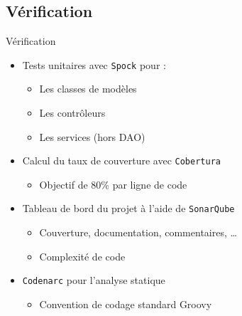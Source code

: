 \subsection{Vérification}
\begin{frame}{Vérification}
	\begin{itemize}
		\item Tests unitaires avec \texttt{Spock} pour : 
		\begin{itemize}
			\item Les classes de modèles
			\item Les contrôleurs
			\item Les services (hors DAO)
		\end{itemize}
		\vfill
		\item Calcul du taux de couverture avec \texttt{Cobertura} 
		\begin{itemize}
			\item Objectif de 80\% par ligne de code
		\end{itemize}
				\vfill
		\item Tableau de bord du projet à l'aide de \texttt{SonarQube}
		\begin{itemize}
			\item Couverture, documentation, commentaires, \ldots 
			\item Complexité de code
		\end{itemize}
				\vfill
		\item \texttt{Codenarc} pour l'analyse statique 
		\begin{itemize}
			\item Convention de codage standard Groovy
		\end{itemize}
	\end{itemize}
\end{frame}

\SteveSpeak
